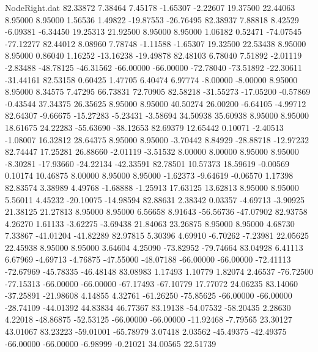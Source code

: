 \begin{filecontents}{NodeRight.dat}
  82.33872    7.38464    7.45178    -1.65307   -2.22607   19.37500   22.44063    8.95000    8.95000    1.56536    1.49822  -19.87553  -26.76495
  82.38937    7.88818    8.42529    -6.09381   -6.34450   19.25313   21.92500    8.95000    8.95000    1.06182    0.52471  -74.07545  -77.12277
  82.44012    8.08960    7.78748    -1.11588   -1.65307   19.32500   22.53438    8.95000    8.95000    0.86040    1.16252  -13.16238  -19.49878
  82.48103    6.78040    7.51892    -2.01119   -2.83488  -48.78125  -46.31562  -66.00000  -66.00000  -72.78040  -73.51892  -22.30611  -31.44161
  82.53158    0.60425    1.47705     6.40474    6.97774   -8.00000   -8.00000    8.95000    8.95000    8.34575    7.47295   66.73831   72.70905
  82.58218  -31.55273  -17.05200    -0.57869   -0.43544   37.34375   26.35625    8.95000    8.95000   40.50274   26.00200   -6.64105   -4.99712
  82.64307   -9.66675  -15.27283    -5.23431   -3.58694   34.50938   35.60938    8.95000    8.95000   18.61675   24.22283  -55.63690  -38.12653
  82.69379   12.65442    0.10071    -2.40513   -1.08007   16.32812   28.64375    8.95000    8.95000   -3.70442    8.84929  -28.88718  -12.97232
  82.74447   17.25281   26.88660    -2.01119   -3.51532    8.00000    8.00000    8.95000    8.95000   -8.30281  -17.93660  -24.22134  -42.33591
  82.78501   10.57373   18.59619    -0.00569    0.10174   10.46875    8.00000    8.95000    8.95000   -1.62373   -9.64619   -0.06570    1.17398
  82.83574    3.38989    4.49768    -1.68888   -1.25913   17.63125   13.62813    8.95000    8.95000    5.56011    4.45232  -20.10075  -14.98594
  82.88631    2.38342    0.03357    -4.69713   -3.90925   21.38125   21.27813    8.95000    8.95000    6.56658    8.91643  -56.56736  -47.07902
  82.93758    4.26270    1.61133    -3.62275   -3.69438   21.84063   23.26875    8.95000    8.95000    4.68730    7.33867  -41.01204  -41.82289
  82.97815    5.30396    4.69910    -6.70262   -7.23981   22.05625   22.45938    8.95000    8.95000    3.64604    4.25090  -73.82952  -79.74664
  83.04928    6.41113    6.67969    -4.69713   -4.76875  -47.55000  -48.07188  -66.00000  -66.00000  -72.41113  -72.67969  -45.78335  -46.48148
  83.08983    1.17493    1.10779     1.82074    2.46537  -76.72500  -77.15313  -66.00000  -66.00000  -67.17493  -67.10779   17.77072   24.06235
  83.14060  -37.25891  -21.98608     4.14855    4.32761  -61.26250  -75.85625  -66.00000  -66.00000  -28.74109  -44.01392   44.83834   46.77367
  83.19138  -54.07532  -58.20435     2.28630    4.22018  -48.86875  -52.53125  -66.00000  -66.00000  -11.92468   -7.79565   23.30127   43.01067
  83.23223  -59.01001  -65.78979     3.07418    2.03562  -45.49375  -42.49375  -66.00000  -66.00000   -6.98999   -0.21021   34.00565   22.51739

\end{filecontents}
